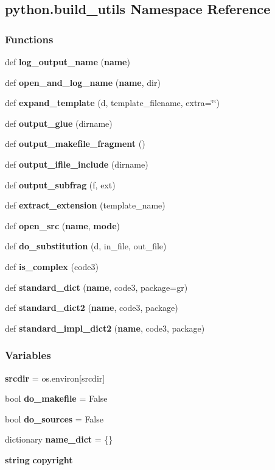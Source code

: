 \subsection{python.\+build\+\_\+utils Namespace Reference}
\label{namespacepython_1_1build__utils}
\subsubsection*{Functions}
\begin{DoxyCompactItemize}
\item 
def {\bf log\+\_\+output\+\_\+name} ({\bf name})
\item 
def {\bf open\+\_\+and\+\_\+log\+\_\+name} ({\bf name}, dir)
\item 
def {\bf expand\+\_\+template} (d, template\+\_\+filename, extra=\char`\"{}\char`\"{})
\item 
def {\bf output\+\_\+glue} (dirname)
\item 
def {\bf output\+\_\+makefile\+\_\+fragment} ()
\item 
def {\bf output\+\_\+ifile\+\_\+include} (dirname)
\item 
def {\bf output\+\_\+subfrag} (f, ext)
\item 
def {\bf extract\+\_\+extension} (template\+\_\+name)
\item 
def {\bf open\+\_\+src} ({\bf name}, {\bf mode})
\item 
def {\bf do\+\_\+substitution} (d, in\+\_\+file, out\+\_\+file)
\item 
def {\bf is\+\_\+complex} (code3)
\item 
def {\bf standard\+\_\+dict} ({\bf name}, code3, package=\textquotesingle{}gr\textquotesingle{})
\item 
def {\bf standard\+\_\+dict2} ({\bf name}, code3, package)
\item 
def {\bf standard\+\_\+impl\+\_\+dict2} ({\bf name}, code3, package)
\end{DoxyCompactItemize}
\subsubsection*{Variables}
\begin{DoxyCompactItemize}
\item 
{\bf srcdir} = os.\+environ[\textquotesingle{}srcdir\textquotesingle{}]
\item 
bool {\bf do\+\_\+makefile} = False
\item 
bool {\bf do\+\_\+sources} = False
\item 
dictionary {\bf name\+\_\+dict} = \{\}
\item 
{\bf string} {\bf copyright}
\end{DoxyCompactItemize}


